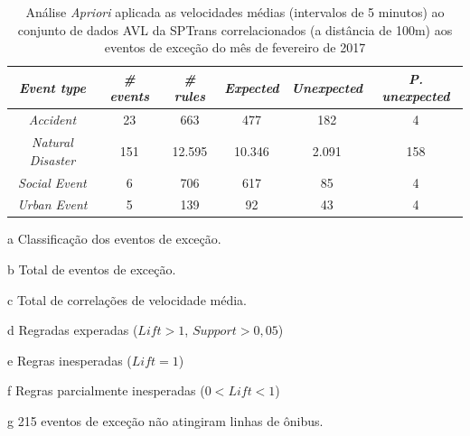 \documentclass[
	12pt,				%
	oneside,			%
	a4paper,			%
	english,			%
	brazil				%
	]{abntex2ppgsi}
\begin{document}
{{\begin{apendicesenv}
\begin{table}[!htb]
\centering
\begin{threeparttable}
\caption {Análise \textit{Apriori} aplicada as velocidades médias (intervalos de 5 minutos) ao conjunto de dados AVL da SPTrans correlacionados (a distância de 100m) aos eventos de exceção do mês de fevereiro de 2017}
\label {tab:aprioriFull}
\begin{tabular}{c|c|c|c|c|c}
\hline
\textbf{\textit{Event type}}\tnote{a} & \textbf{\textit{\# events}}\tnote{b} & \textit{\textbf{\# rules}}\tnote{c} & \textbf{\textit{Expected}}\tnote{d} & \textbf{\textit{Unexpected}}\tnote{e} & \textbf{\textit{P. unexpected}}\tnote{f}   \\
\hline
\textit{Accident} & 23 & 663 & 477 & 182 & 4 \\
\textit{Natural Disaster} & 151 & 12.595 & 10.346 & 2.091 & 158 \\
\textit{Social Event} & 6 & 706 & 617 & 85 & 4 \\
\textit{Urban Event} & 5 & 139 & 92 & 43 & 4 \\
\hline
\end{tabular}
\begin{tablenotes}
            \item[a] Classificação dos eventos de exceção.
            \item[b] Total de eventos de exceção.
            \item[c] Total de correlações de velocidade média.
            \item[d] Regradas experadas ($Lift > 1$, $Support > 0,05$)
            \item[e] Regras inesperadas ($Lift = 1$)
            \item[f] Regras parcialmente inesperadas ($0 < Lift < 1$)
            \item[g] 215 eventos de exceção não atingiram linhas de ônibus.
        \end{tablenotes}
\end{threeparttable}
\end{table}


\end{apendicesenv}}}
\end{document}
